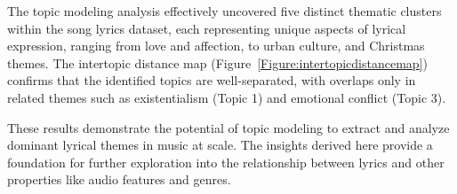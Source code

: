 The topic modeling analysis effectively uncovered five distinct thematic
clusters within the song lyrics dataset, each representing unique aspects of
lyrical expression, ranging from love and affection, to urban culture, and
Christmas themes. The intertopic distance map
(Figure~\ref{Figure:intertopicdistancemap}) confirms that the identified topics
are well-separated, with overlaps only in related themes such as existentialism
(Topic 1) and emotional conflict (Topic 3).

These results demonstrate the potential of topic modeling to extract and
analyze dominant lyrical themes in music at scale. The insights derived here
provide a foundation for further exploration into the relationship between
lyrics and other properties like audio features and genres.
